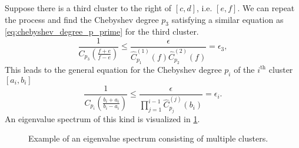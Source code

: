 Suppose there is a third cluster to the right of $[c,d]$, i.e. $[e,f]$. We can repeat the process and find the Chebyshev degree $p_3$ satisfying a similar equation as \cref{eq:chebyshev_degree_p_prime} for the third cluster.
\[
    \frac{1}{C_{p_3}\left(\frac{f+e}{f-e}\right)} \leq \frac{\epsilon}{\hat{C}^{(1)}_{p_1}(f)\hat{C}^{(2)}_{p_2}(f)} = \epsilon_3,
\]
This leads to the general equation for the Chebyshev degree $p_i$ of the $i^{\text{th}}$ cluster $[a_i, b_i]$
\begin{equation}
    \frac{1}{C_{p_i}\left(\frac{b_i + a_i}{b_i - a_i}\right)} \leq \frac{\epsilon}{\prod_{j=1}^{i-1} \hat{C}^{(j)}_{p_j}(b_i)} = \epsilon_i.
    \label{eq:chebyshev_degree_p_i}
\end{equation}
An eigenvalue spectrum of this kind is visualized in \cref{fig:multiple_eigenvalue_clusters}.
\begin{figure}[H]
    \centering
    
    \caption{Example of an eigenvalue spectrum consisting of multiple clusters.}
    \label{fig:multiple_eigenvalue_clusters}
\end{figure}

